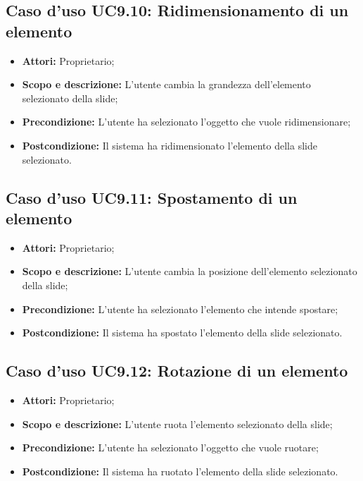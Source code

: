 \subsection{Caso d'uso UC9.10: Ridimensionamento di un elemento}
\begin{itemize}
	\item \textbf{Attori:} Proprietario;
	\item \textbf{Scopo e descrizione:} L'utente cambia la grandezza dell'elemento selezionato della \gls{slide};
	\item \textbf{Precondizione:} L'utente ha selezionato l'oggetto che vuole ridimensionare;
	\item \textbf{Postcondizione:} Il sistema ha ridimensionato l'elemento della \gls{slide} selezionato.
\end{itemize}


\subsection{Caso d'uso UC9.11: Spostamento di un elemento}
\begin{itemize}
	\item \textbf{Attori:} Proprietario;
	\item \textbf{Scopo e descrizione:} L'utente cambia la posizione dell'elemento selezionato della \gls{slide};
	\item \textbf{Precondizione:} L'utente ha selezionato l'elemento che intende spostare;
	\item \textbf{Postcondizione:} Il sistema ha spostato l'elemento della \gls{slide} selezionato.
\end{itemize}


\subsection{Caso d'uso UC9.12: Rotazione di un elemento}
\begin{itemize}
	\item \textbf{Attori:} Proprietario;
	\item \textbf{Scopo e descrizione:} L'utente ruota l'elemento selezionato della \gls{slide};
	\item \textbf{Precondizione:} L'utente ha selezionato l'oggetto che vuole ruotare;
	\item \textbf{Postcondizione:} Il sistema ha ruotato l'elemento della \gls{slide} selezionato.
\end{itemize}


